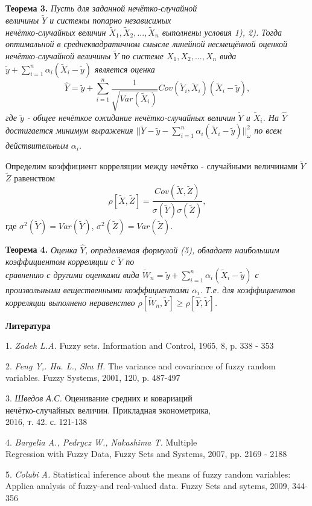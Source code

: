 \textbf{Теорема 3.} \textit{Пусть для заданной нечётко-случайной
\\величины $\tilde{Y}$ и системы попарно независимых
\\нечётко-случайных величин $\tilde{X}_1, \tilde{X}_2,..., \tilde{X}_n$ выполнены условия 1), 2). Тогда оптимальной в среднеквадратичном смысле линейной несмещённой оценкой нечётко-случайной величины $\tilde{Y}$ по системе $X_1, X_2,..., X_n$ вида $\tilde{y}+\sum\limits_{i=1}^n\alpha_i(\tilde{X}_i - \tilde{y})$ является оценка }
\begin{equation}
\hat{Y} = \tilde{y} + \sum\limits_{i=1}^n\frac{1}{\sqrt{Var(\tilde{X}_i)}}Cov(\tilde{Y}_i, \tilde{X}_i)(\tilde{X}_i-\tilde{y}),
\end{equation}
\textit{где $\tilde{y}$ - общее нечёткое ожидание нечётко-случайных величин $\tilde{Y}$ и $\tilde{X}_i$. На $\hat{Y}$ достигается минимум выражения $||\tilde{Y} - \tilde{y} -\sum\limits_{i=1}^n\alpha_i(\tilde{X}_i-\tilde{y})||_{\omega}^2$ по всем действительным $\alpha_i$.}

Определим коэффициент корреляции между нечётко - случайными величинами $\tilde{Y}$ $\tilde{Z}$ равенством
$$
\rho[\tilde{X}, \tilde{Z}] = \frac{Cov(\tilde{X}, \tilde{Z})}{\sigma(\tilde{Y})\sigma(\tilde{Z})},
$$
где $\sigma^2(\tilde{Y}) = Var(\tilde{Y})$, $\sigma^2(\tilde{Z}) = Var(\tilde{Z})$.

\textbf{Теорема 4.} \textit{Оценка $\hat{Y}$, определяемая формулой (5), обладает наибольшим коэффициентом корреляции с $\tilde{Y}$ по
\\сравнению с другими оценками вида $\tilde{W}_n = \tilde{y} + \sum\limits_{i=1}^n\alpha_i(\tilde{X}_i - \tilde{y})$ с произвольными вещественными коэффициентами $\alpha_i$. Т.е. для коэффициентов корреляции выполнено неравенство $\rho[\tilde{W}_n, \tilde{Y}]\geq \rho[\hat{Y},\tilde{Y}] $.}

\smallskip \centerline {\bf Литература} \nopagebreak

1. {\it Zadeh L.A.} Fuzzy sets. Information and Control, 1965, 8, p. 338 - 353

2. {\it Feng Y,. Hu. L., Shu H.} The variance and covariance of fuzzy random variables. Fuzzy Systems,
2001, 120, p. 487-497

3. {\it Шведов А.С.} Оценивание средних и ковариаций
\\нечётко-случайных величин. Прикладная эконометрика,
\\2016, т. 42. с. 121-138

4. {\it Bargelia A., Pedrycz W., Nakashima T.} Multiple
\\Regression with Fuzzy Data, Fuzzy Sets and Systems, 2007, pp. 2169 - 2188

5. {\it Colubi A.} Statistical inference about the means of fuzzy random variables: Applica analysis of fuzzy-and real-valued data. Fuzzy Sets and sytems, 2009, 344-356
